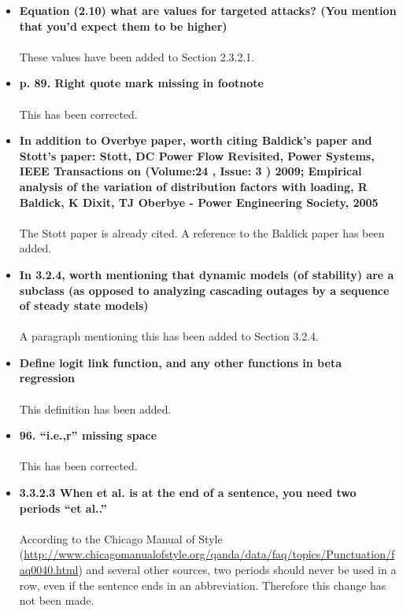 \documentclass[a4paper,10pt]{article}
\begin{document}
\begin{itemize}
 \item \textbf{Equation (2.10) what are values for targeted attacks? (You mention that you'd expect them to be higher)}\\
 \\
 These values have been added to Section 2.3.2.1. 
 
 \item \textbf{p. 89.  Right quote mark missing in footnote}\\
 \\
 This has been corrected. 
 
 \item \textbf{In addition to Overbye paper, worth citing Baldick's paper and Stott's paper: Stott, DC Power Flow Revisited, Power Systems, IEEE Transactions on  (Volume:24 ,  Issue: 3 ) 2009; Empirical analysis of the variation of distribution factors with loading, R Baldick, K Dixit, TJ Oberbye - Power Engineering Society, 2005}\\
 \\
 The Stott paper is already cited. A reference to the Baldick paper has been added.
 
 \item \textbf{In 3.2.4, worth mentioning that dynamic models (of stability) are a subclass (as opposed to analyzing cascading outages by a sequence of steady state models)}\\
 \\
 A paragraph mentioning this has been added to Section 3.2.4.
 
 \item \textbf{Define logit link function, and any other functions in beta regression}\\
 \\
 This definition has been added. 

 \item \textbf{96.  ``i.e.,r'' missing space}\\
 \\
 This has been corrected. 
 
 \item \textbf{3.3.2.3 When et al. is at the end of a sentence, you need two periods ``et al..''}\\
 \\
 According to the Chicago Manual of Style (\url{http://www.chicagomanualofstyle.org/qanda/data/faq/topics/Punctuation/faq0040.html}) and several other sources, two periods should never be used in a row, even if the sentence ends in an abbreviation.  Therefore this change has not been made.
 

\end{itemize}
\end{document}
